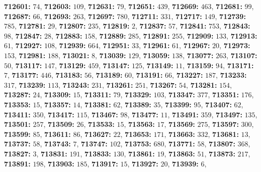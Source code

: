 \textsf{\bfseries 712601:} $74$, \textsf{\bfseries 712603:} $109$, \textsf{\bfseries 712631:} $79$, \textsf{\bfseries 712651:} $439$, \textsf{\bfseries 712669:} $463$, \textsf{\bfseries 712681:} $99$, \textsf{\bfseries 712687:} $66$, \textsf{\bfseries 712693:} $263$, \textsf{\bfseries 712697:} $780$, \textsf{\bfseries 712711:} $331$, \textsf{\bfseries 712717:} $149$, \textsf{\bfseries 712739:} $785$, \textsf{\bfseries 712781:} $29$, \textsf{\bfseries 712807:} $235$, \textsf{\bfseries 712819:} $2$, \textsf{\bfseries 712837:} $57$, \textsf{\bfseries 712841:} $753$, \textsf{\bfseries 712843:} $98$, \textsf{\bfseries 712847:} $28$, \textsf{\bfseries 712883:} $158$, \textsf{\bfseries 712889:} $285$, \textsf{\bfseries 712891:} $255$, \textsf{\bfseries 712909:} $133$, \textsf{\bfseries 712913:} $61$, \textsf{\bfseries 712927:} $108$, \textsf{\bfseries 712939:} $664$, \textsf{\bfseries 712951:} $33$, \textsf{\bfseries 712961:} $61$, \textsf{\bfseries 712967:} $20$, \textsf{\bfseries 712973:} $153$, \textsf{\bfseries 712981:} $188$, \textsf{\bfseries 713021:} $8$, \textsf{\bfseries 713039:} $129$, \textsf{\bfseries 713059:} $138$, \textsf{\bfseries 713077:} $263$, \textsf{\bfseries 713107:} $50$, \textsf{\bfseries 713117:} $147$, \textsf{\bfseries 713129:} $459$, \textsf{\bfseries 713147:} $125$, \textsf{\bfseries 713149:} $11$, \textsf{\bfseries 713159:} $94$, \textsf{\bfseries 713171:} $7$, \textsf{\bfseries 713177:} $446$, \textsf{\bfseries 713183:} $56$, \textsf{\bfseries 713189:} $60$, \textsf{\bfseries 713191:} $66$, \textsf{\bfseries 713227:} $187$, \textsf{\bfseries 713233:} $317$, \textsf{\bfseries 713239:} $113$, \textsf{\bfseries 713243:} $231$, \textsf{\bfseries 713261:} $251$, \textsf{\bfseries 713267:} $54$, \textsf{\bfseries 713281:} $154$, \textsf{\bfseries 713287:} $24$, \textsf{\bfseries 713309:} $15$, \textsf{\bfseries 713311:} $79$, \textsf{\bfseries 713329:} $103$, \textsf{\bfseries 713347:} $377$, \textsf{\bfseries 713351:} $176$, \textsf{\bfseries 713353:} $15$, \textsf{\bfseries 713357:} $14$, \textsf{\bfseries 713381:} $62$, \textsf{\bfseries 713389:} $35$, \textsf{\bfseries 713399:} $95$, \textsf{\bfseries 713407:} $62$, \textsf{\bfseries 713411:} $350$, \textsf{\bfseries 713417:} $115$, \textsf{\bfseries 713467:} $98$, \textsf{\bfseries 713477:} $11$, \textsf{\bfseries 713491:} $359$, \textsf{\bfseries 713497:} $135$, \textsf{\bfseries 713501:} $257$, \textsf{\bfseries 713509:} $26$, \textsf{\bfseries 713533:} $15$, \textsf{\bfseries 713563:} $17$, \textsf{\bfseries 713569:} $275$, \textsf{\bfseries 713597:} $300$, \textsf{\bfseries 713599:} $85$, \textsf{\bfseries 713611:} $86$, \textsf{\bfseries 713627:} $22$, \textsf{\bfseries 713653:} $171$, \textsf{\bfseries 713663:} $332$, \textsf{\bfseries 713681:} $13$, \textsf{\bfseries 713737:} $58$, \textsf{\bfseries 713743:} $7$, \textsf{\bfseries 713747:} $102$, \textsf{\bfseries 713753:} $680$, \textsf{\bfseries 713771:} $58$, \textsf{\bfseries 713807:} $368$, \textsf{\bfseries 713827:} $3$, \textsf{\bfseries 713831:} $191$, \textsf{\bfseries 713833:} $130$, \textsf{\bfseries 713861:} $19$, \textsf{\bfseries 713863:} $51$, \textsf{\bfseries 713873:} $217$, \textsf{\bfseries 713891:} $198$, \textsf{\bfseries 713903:} $185$, \textsf{\bfseries 713917:} $15$, \textsf{\bfseries 713927:} $20$, \textsf{\bfseries 713939:} $6$, 
